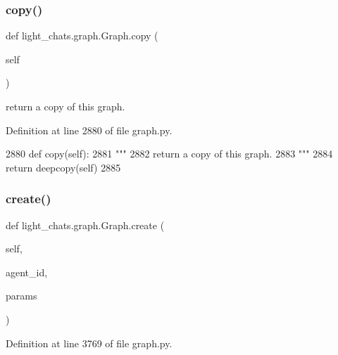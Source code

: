 \subsubsection{\texorpdfstring{copy()}{copy()}}
{\footnotesize\ttfamily def light\+\_\+chats.\+graph.\+Graph.\+copy (\begin{DoxyParamCaption}\item[{}]{self }\end{DoxyParamCaption})}

\begin{DoxyVerb}return a copy of this graph.
\end{DoxyVerb}
 

Definition at line 2880 of file graph.\+py.


\begin{DoxyCode}
2880     \textcolor{keyword}{def }copy(self):
2881         \textcolor{stringliteral}{"""}
2882 \textcolor{stringliteral}{        return a copy of this graph.}
2883 \textcolor{stringliteral}{        """}
2884         \textcolor{keywordflow}{return} deepcopy(self)
2885 
\end{DoxyCode}
\mbox{\label{classlight__chats_1_1graph_1_1Graph_acc495d94797d39558b1711d0bbf6346d}} 
\subsubsection{\texorpdfstring{create()}{create()}}
{\footnotesize\ttfamily def light\+\_\+chats.\+graph.\+Graph.\+create (\begin{DoxyParamCaption}\item[{}]{self,  }\item[{}]{agent\+\_\+id,  }\item[{}]{params }\end{DoxyParamCaption})}



Definition at line 3769 of file graph.\+py.


